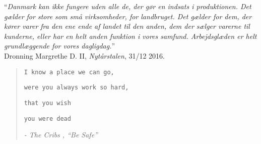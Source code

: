 


\newpage 
\begin{center}
\vspace*{2in}
“\emph{Danmark kan ikke fungere uden alle de, der gør en indsats i produktionen. Det gælder for store som små virksomheder, for landbruget. Det gælder for dem, der kører varer fra	den ene ende af landet til den anden, dem der sælger varerne til kunderne, eller har en helt anden funktion i vores samfund. Arbejdsglæden er helt grundlæggende for vores dagligdag.}” \\

\vspace{1cm}
\hfill Dronning Margrethe D. II, \emph{Nytårstalen}, 31/12 2016.
\end{center}
\newpage 




\newcommand{\leftPoemTitle}[1]{{\PoemTitlefont{#1}}\\[\afterPoemTitleskip]}

\settowidth{\versewidth}{were you always work so hard,} 
\begin{verse}

\begin{center}
\vspace*{1.5in}


\texttt{I know a place we can go, }

\texttt{were you always work so hard, }

\texttt{that you wish }

\texttt{you were dead}

\vspace{0.5cm}


\emph{\small - The Cribs , “Be Safe”}



\vspace{1cm}

\end{center}
\end{verse}








